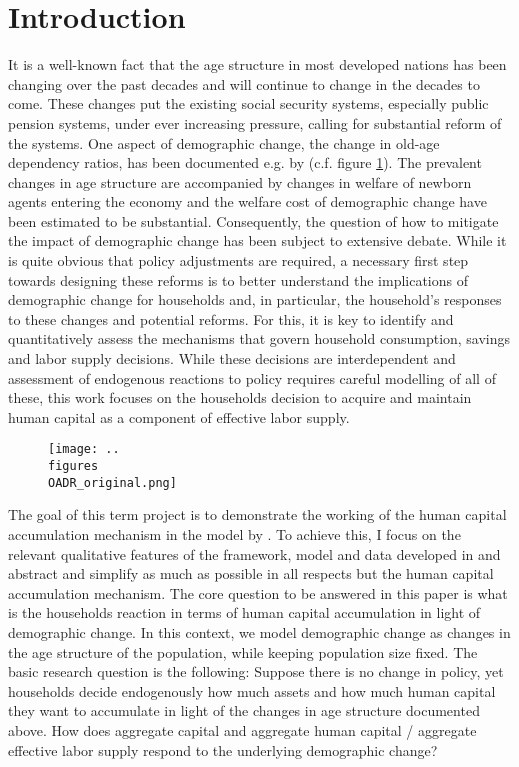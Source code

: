 \section{Introduction} %
\label{sec:introduction}

It is a well-known fact that the age structure in most developed nations has been changing over the past decades and will continue to change in the decades to come. These changes put the existing social security systems, especially public pension systems, under ever increasing pressure, calling for substantial reform of the systems. One aspect of demographic change, the change in old-age dependency ratios, has been documented e.g. by \cite{LudwigSchelkleVogel2012} (c.f. figure \ref{fig:OADR_original}). The prevalent changes in age structure are accompanied by changes in welfare of newborn agents entering the economy and the welfare cost of demographic change have been estimated to be substantial. Consequently, the question of how to mitigate the impact of demographic change has been subject to extensive debate. While it is quite obvious that policy adjustments are required, a necessary first step towards designing these reforms is to better understand the implications of demographic change for households and, in particular, the household's responses to these changes and potential reforms. For this, it is key to identify and quantitatively assess the mechanisms that govern household consumption, savings and labor supply decisions. While these decisions are interdependent and assessment of endogenous reactions to policy requires careful modelling of all of these, this work focuses on the households decision to acquire and maintain human capital as a component of effective labor supply.

\begin{figure}[H]
    \texttt{[image: ..\\figures\\OADR\_original.png]}
    \label{fig:OADR_original}
\end{figure}

The goal of this term project is to demonstrate the working of the human capital accumulation mechanism in the model by \cite{LudwigSchelkleVogel2012}. To achieve this, I focus on the relevant qualitative features of the framework, model and data developed in \cite{LudwigSchelkleVogel2012} and abstract and simplify as much as possible in all respects but the human capital accumulation mechanism. The core question to be answered in this paper is what is the households reaction in terms of human capital accumulation in light of demographic change. In this context, we model demographic change as changes in the age structure of the population, while keeping population size fixed. The basic research question is the following: Suppose there is no change in policy, yet households decide endogenously how much assets and how much human capital they want to accumulate in light of the changes in age structure documented above. How does aggregate capital and aggregate human capital / aggregate effective labor supply respond to the underlying demographic change?


